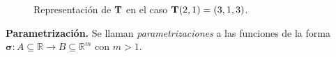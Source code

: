 \begin{example}
\begin{figure}[H]
\begin{center}
      \caption{Representación de $\campoVec{T}$ en el caso $\campoVec{T}(2,1) = (3,1,3)$.}
      \end{center}
  \end{figure}
   \end{example}
\begin{definition} {\textbf{Parametrización.}}
  Se llaman \emph{parametrizaciones} a las funciones de la forma $\boldsymbol{\sigma}:A\subseteq\mathbb{R}\rightarrow B\subseteq\mathbb{R}^m$ con $ m>1$.   
\end{definition}

